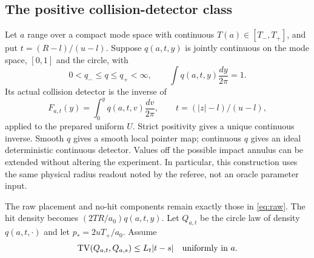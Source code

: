 \subsection{The positive collision-detector class}
Let $a$ range over a compact mode space with continuous $T(a)\in[T_-,T_+]$, and put $t=(R-l)/(u-l)$. Suppose $q(a,t,y)$ is jointly continuous on the mode space, $[0,1]$ and the circle, with
\begin{equation}
 0<q_-\le q\le q_+<\infty,\qquad
 \int q(a,t,y)\frac{dy}{2\pi}=1.
 \label{eq:detector-class}
\end{equation}
Its actual collision detector is the inverse of
\[
 F_{a,t}(y)=\int_0^y q(a,t,v)\frac{dv}{2\pi},\qquad
 t=(|z|-l)/(u-l),
\]
applied to the prepared uniform $U$. Strict positivity gives a unique continuous inverse. Smooth $q$ gives a smooth local pointer map; continuous $q$ gives an ideal deterministic continuous detector. Values off the possible impact annulus can be extended without altering the experiment. In particular, this construction uses the same physical radius readout noted by the referee, not an oracle parameter input.

The raw placement and no-hit components remain exactly those in \eqref{eq:raw}. The hit density becomes $(2TR/a_0)q(a,t,y)$. Let $Q_{a,t}$ be the circle law of density $q(a,t,\cdot)$ and let $p_*=2uT_+/a_0$. Assume
\begin{equation}
 \operatorname{TV}(Q_{a,t},Q_{a,s})\le L_t|t-s|\quad\hbox{uniformly in }a.
 \label{eq:detector-lip}
\end{equation}

